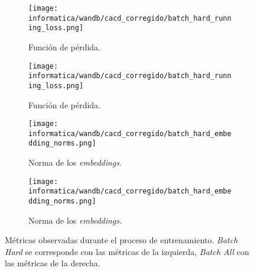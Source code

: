 \begin{figure}[!hbtp]
    \centering
    \begin{subfigure}{.5\textwidth}
        \centering
        \texttt{[image: informatica/wandb/cacd\_corregido/batch\_hard\_running\_loss.png]}
        \caption{Función de pérdida.}
    \end{subfigure}%
    \begin{subfigure}{.5\textwidth}
        \centering
        \texttt{[image: informatica/wandb/cacd\_corregido/batch\_hard\_running\_loss.png]}
        \caption{Función de pérdida.}
    \end{subfigure}

    \begin{subfigure}{.5\textwidth}
        \centering
        \texttt{[image: informatica/wandb/cacd\_corregido/batch\_hard\_embedding\_norms.png]}
        \caption{Norma de los \textit{embeddings}.}
    \end{subfigure}%
    \begin{subfigure}{.5\textwidth}
        \centering
        \texttt{[image: informatica/wandb/cacd\_corregido/batch\_hard\_embedding\_norms.png]}
        \caption{Norma de los \textit{embeddings}.}
    \end{subfigure}
    \caption{Métricas observadas durante el proceso de entrenamiento. \textit{Batch Hard} se corresponde con las métricas de la izquierda, \textit{Batch All} con las métricas de la derecha.}
    \label{img:proceso_entrenamiento_cacd_corregido}
\end{figure}

